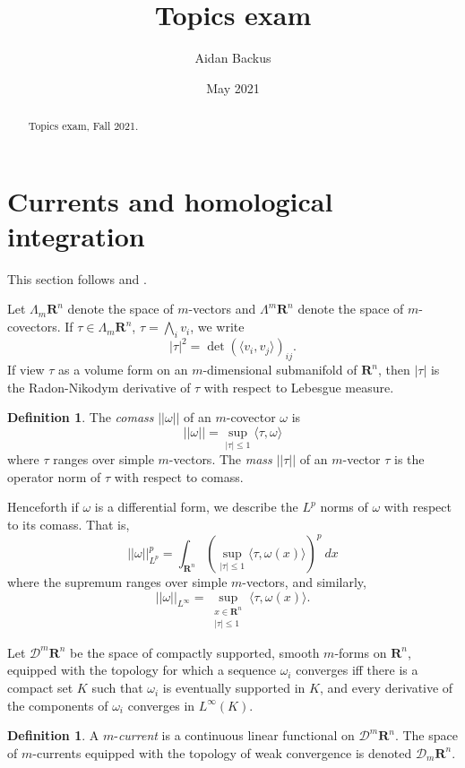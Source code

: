 \documentclass[reqno,12pt,letterpaper]{amsart}
\title[Topics exam]{Topics exam}
\author{Aidan Backus}
\date{May 2021}
\newcommand{\RR}{\mathbf{R}}
\newcommand{\dfn}[1]{\emph{#1}\index{#1}}
\theoremstyle{definition}
\newtheorem{definition}[theorem]{Definition}
\numberwithin{equation}{section}
\begin{document}
\begin{abstract}
Topics exam, Fall 2021.
\end{abstract}

\maketitle

\tableofcontents

\section{Currents and homological integration}
This section follows \cite{urs2005GMT} and \cite{simon1983GMT}.

Let $\Lambda_m\RR^n$ denote the space of $m$-vectors and $\Lambda^m\RR^n$ denote the space of $m$-covectors.
If $\tau \in \Lambda_m \RR^n$, $\tau = \bigwedge_i v_i$, we write
$$|\tau|^2 = \det(\langle v_i, v_j\rangle)_{ij}.$$
If view $\tau$ as a volume form on an $m$-dimensional submanifold of $\RR^n$, then $|\tau|$ is the Radon-Nikodym derivative of $\tau$ with respect to Lebesgue measure.

\begin{definition}
The \dfn{comass} $||\omega||$ of an $m$-covector $\omega$ is
$$||\omega|| = \sup_{|\tau| \leq 1} \langle \tau, \omega\rangle$$
where $\tau$ ranges over simple $m$-vectors. The \dfn{mass} $||\tau||$ of an $m$-vector $\tau$ is the operator norm of $\tau$ with respect to comass.
\end{definition}

Henceforth if $\omega$ is a differential form, we describe the $L^p$ norms of $\omega$ with respect to its comass. That is,
$$||\omega||_{L^p}^p = \int_{\RR^n} \left(\sup_{|\tau| \leq 1} \langle \tau, \omega(x)\rangle\right)^p ~dx$$
where the supremum ranges over simple $m$-vectors, and similarly,
$$||\omega||_{L^\infty} = \sup_{\substack{x \in \RR^n\\|\tau| \leq 1}} \langle \tau, \omega(x)\rangle.$$

Let $\mathcal D^m\RR^n$ be the space of compactly supported, smooth $m$-forms on $\RR^n$, equipped with the topology for which a sequence $\omega_i$ converges iff there is a compact set $K$ such that $\omega_i$ is eventually supported in $K$, and every derivative of the components of $\omega_i$ converges in $L^\infty(K)$.

\begin{definition}
A $m$-\dfn{current} is a continuous linear functional on $\mathcal D^m\RR^n$.
The space of $m$-currents equipped with the topology of weak convergence is denoted $\mathcal D_m\RR^n$.
\end{definition}
\end{document}
